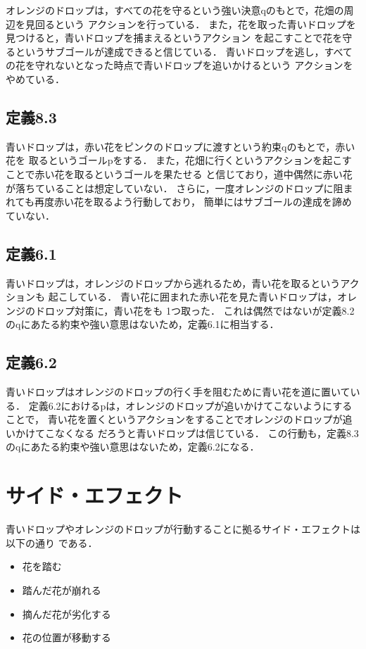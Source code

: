 \documentclass[a4]{jsarticle}
\begin{document}
オレンジのドロップは，すべての花を守るという強い決意qのもとで，花畑の周辺を見回るという
アクションを行っている．
また，花を取った青いドロップを見つけると，青いドロップを捕まえるというアクション
を起こすことで花を守るというサブゴールが達成できると信じている．
青いドロップを逃し，すべての花を守れないとなった時点で青いドロップを追いかけるという
アクションをやめている．

\subsection{定義8.3}
青いドロップは，赤い花をピンクのドロップに渡すという約束qのもとで，赤い花を
取るというゴールpをする．
また，花畑に行くというアクションを起こすことで赤い花を取るというゴールを果たせる
と信じており，道中偶然に赤い花が落ちていることは想定していない．
さらに，一度オレンジのドロップに阻まれても再度赤い花を取るよう行動しており，
簡単にはサブゴールの達成を諦めていない．

\subsection{定義6.1}
青いドロップは，オレンジのドロップから逃れるため，青い花を取るというアクションも
起こしている．
青い花に囲まれた赤い花を見た青いドロップは，オレンジのドロップ対策に，青い花をも
1つ取った．
これは偶然ではないが定義8.2のqにあたる約束や強い意思はないため，定義6.1に相当する．

\subsection{定義6.2}
青いドロップはオレンジのドロップの行く手を阻むために青い花を道に置いている．
定義6.2におけるpは，オレンジのドロップが追いかけてこないようにすることで，
青い花を置くというアクションをすることでオレンジのドロップが追いかけてこなくなる
だろうと青いドロップは信じている．
この行動も，定義8.3のqにあたる約束や強い意思はないため，定義6.2になる．

\section{サイド・エフェクト}
青いドロップやオレンジのドロップが行動することに拠るサイド・エフェクトは以下の通り
である．
\begin{itemize}
	\item 花を踏む
	\item 踏んだ花が崩れる
	\item 摘んだ花が劣化する
	\item 花の位置が移動する
\end{itemize}
\end{document}
